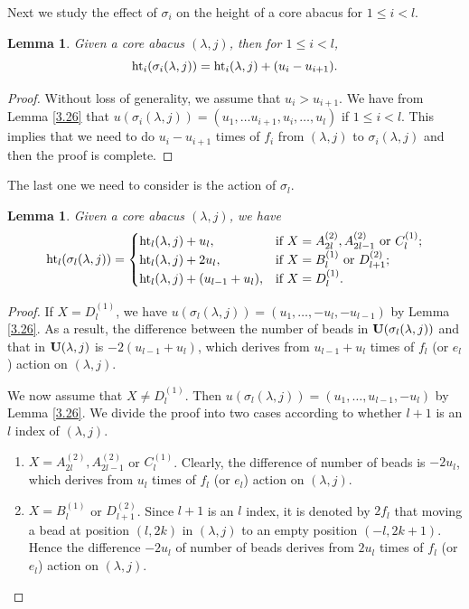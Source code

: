 \documentclass[11pt]{amsart}
\theoremstyle{plain}
\numberwithin{equation}{subsection}
\newtheorem{lemma}[theorem]{Lemma}
\newcommand{\lam}{\lambda}
\begin{document}
Next we study the effect of $\sigma_i$ on the height of a core abacus for $1\leq i<l$.

\begin{lemma}\label{4.2}
Given a core abacus $(\lam, j)$, then for $1\leq i<l$, 
$${\rm ht}_i(\sigma_{i}(\lambda,j))={\rm ht}_i(\lambda,j)+(u_i-u_{i+1}).$$ 
\end{lemma}

\begin{proof}
Without loss of generality, we assume that $u_i>u_{i+1}$.
We have from Lemma \ref{3.26} that $u(\sigma_i(\lam, j))=
(u_1, \dots u_{i+1}, u_i, \dots, u_l)$ if $1\leq i<l$. This implies that we need to do $u_i-u_{i+1}$ times of $f_i$
from $(\lam, j)$ to $\sigma_i(\lam, j)$ and then the proof is complete.
\end{proof}

The last one we need to consider is the action of $\sigma_l$.

\begin{lemma}\label{4.3}
Given a core abacus $(\lam, j)$, we have
$${\rm ht}_l(\sigma_{l}(\lambda,j))=
\begin{cases}
{\rm ht}_l(\lambda,j)+u_l, & \text{\rm if $X = A_{2l}^{(2)}, A_{2l-1}^{(2)}$ or $C_l^{(1)}$};\\
{\rm ht}_l(\lambda,j)+2u_l, & \text{\rm if $X = B_l^{(1)}$ or $D_{l+1}^{(2)}$};\\
{\rm ht}_l(\lambda,j)+(u_{l-1}+u_{l}), & \text{\rm if $X = D_{l}^{(1)}$}.
\end{cases}
$$ 
\end{lemma}

\begin{proof}
If $X = D_{l}^{(1)}$, we have $u(\sigma_l(\lam, j))=
(u_1, \dots, -u_{l}, -u_{l-1})$ by Lemma \ref{3.26}. As a result, the difference between the number of beads in 
${\rm\bf U}(\sigma_l(\lam, j))$ and that in ${\rm\bf U}(\lam, j)$ is $-2(u_{l-1}+u_l)$, which derives from $u_{l-1}+u_l$
times of $f_l$ (or $e_l$) action on $(\lam, j)$.

We now assume that $X \neq D_{l}^{(1)}$. Then $u(\sigma_l(\lam, j))=
(u_1, \dots,  u_{l-1}, -u_{l})$ by Lemma \ref{3.26}. We divide the proof into two cases according to
whether $l+1$ is an $l$ index of $(\lam, j)$.
\begin{enumerate}
\item [\rm Case 1.] $X= A_{2l}^{(2)}, A_{2l-1}^{(2)}$ or $C_l^{(1)}$. Clearly, the difference of number of beads is $-2u_l$,
which derives from $u_l$ times of $f_l$ (or $e_l$) action on $(\lam, j)$.
\item [\rm Case 2.] $X =  B_l^{(1)}$ or $D_{l+1}^{(2)}$. Since $l+1$ is an $l$ index, 
it is denoted by $2f_l$ that moving a bead at position $(l, 2k)$ in $(\lam, j)$ to an empty position $(-l, 2k+1)$.
Hence the difference $-2u_l$ of number of beads derives from $2u_{l}$
times of $f_l$ (or $e_l$) action on $(\lam, j)$.
\end{enumerate}
\end{proof}
\end{document}
